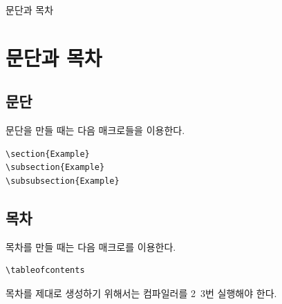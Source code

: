\documentclass{beamer}
\begin{document}
\begin{frame}[fragile]{문단과 목차}
    \section{문단과 목차}
    \subsection{문단}
    문단을 만들 때는 다음 매크로들을 이용한다.
    \begin{lstlisting}[numbers=none]
\section{Example}
\subsection{Example}
\subsubsection{Example}
    \end{lstlisting}

    \subsection{목차}
    목차를 만들 때는 다음 매크로를 이용한다.
    \begin{lstlisting}[numbers=none]
\tableofcontents
    \end{lstlisting}

    목차를 제대로 생성하기 위해서는 컴파일러를 2~3번 실행해야 한다.
\end{frame}
\end{document}
